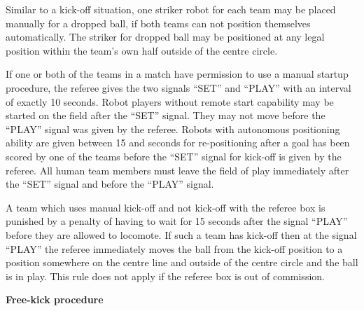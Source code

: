Similar to a kick-off situation, one striker robot for each team may be placed manually for a dropped ball, if both teams can not position themselves automatically. The striker for dropped ball may be positioned at any legal position within the team's own half outside of the centre circle.

\bigskip

If one or both of the teams in a match have permission to use a manual startup procedure, the referee gives the two signals ``SET'' and ``PLAY'' with an interval of exactly
10 seconds. Robot players without remote start capability may be started on the field after the ``SET'' signal. They may not move before the ``PLAY'' signal was given
by the referee. Robots with autonomous positioning ability are given between 15 and   seconds for re-positioning after a goal has been scored by one of the teams before the ``SET'' signal for kick-off is given by the referee. All human team members must leave the field of play immediately after the ``SET'' signal and before the ``PLAY'' signal.

A team which uses manual kick-off and not kick-off with the referee box is punished by a penalty of having to wait for 15 seconds after the signal ``PLAY'' before they are
allowed to locomote. If such a team has kick-off then at the signal ``PLAY'' the referee immediately moves the ball from the kick-off position to a position somewhere on
the centre line and outside of the centre circle and the ball is in play. This rule does not apply if the referee box is out of commission.

\bigskip


{\bfseries Free-kick procedure}

